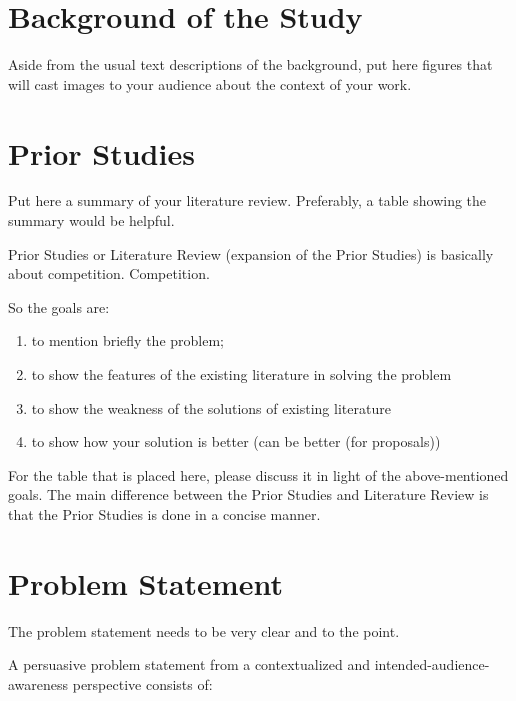 \section{Background of the Study}

Aside from the usual text descriptions of the background, put here figures that will cast images to your audience about the context of your work.

\textcolor[rgb]{0.75,0.75,0.75}{\Blindtext}


\section{Prior Studies}

Put here a summary of your literature review.  Preferably, a table showing the summary would be helpful. 

Prior Studies or Literature Review (expansion of the Prior Studies) is basically about competition. Competition.

So the goals are:

\begin{enumerate}
	\item to mention briefly the problem; 

	\item to show the features of the existing literature in solving the problem

	\item to show the weakness of the solutions of existing literature 

	\item to show how your solution is better (can be better (for proposals))
\end{enumerate}

\noindent For the table that is placed here, please discuss it in light of the above-mentioned goals. The main difference between the Prior Studies and Literature Review is that the Prior Studies is done in a concise manner.

 \textcolor[rgb]{0.75,0.75,0.75}{\blindtext}


\section{Problem Statement}

The problem statement needs to be very clear and to the point. 

\noindent A persuasive problem statement from a contextualized and intended-audience-awareness perspective consists of:

